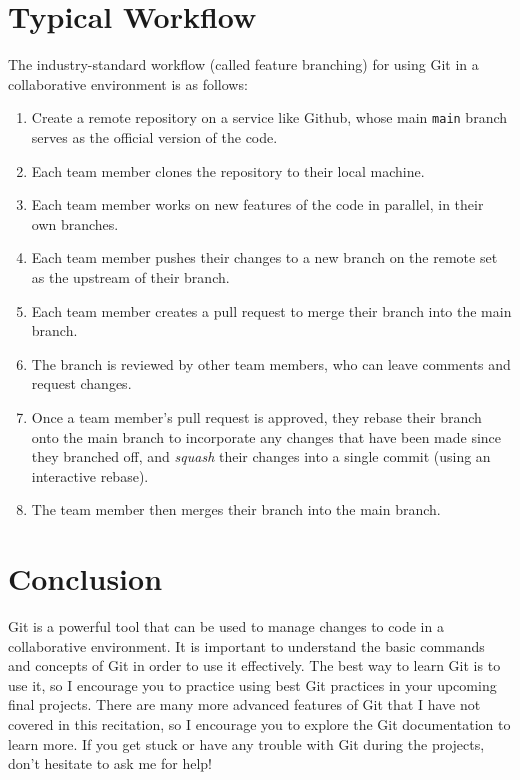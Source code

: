 \documentclass[fleqn]{article}
\begin{document}
\section*{Typical Workflow}

The industry-standard workflow (called feature branching) for using Git in a
collaborative environment is as follows:

\begin{enumerate}

    \item Create a remote repository on a service like Github, whose main
          \texttt{main} branch serves as the official version of the code.
    \item Each team member clones the repository to their local machine.
    \item Each team member works on new features of the code in parallel, in
          their own branches.
    \item Each team member pushes their changes to a new branch on the remote
          set as the upstream of their branch.
    \item Each team member creates a pull request to merge their branch into
          the main branch.
    \item The branch is reviewed by other team members, who can leave comments
          and request changes.
    \item Once a team member's pull request is approved, they rebase their
          branch onto the main branch to incorporate any changes that have been
          made since they branched off, and  \emph{squash} their changes into a
          single commit (using an interactive rebase).
    \item The team member then merges their branch into the main branch.
\end{enumerate}

\section*{Conclusion}

Git is a powerful tool that can be used to manage changes to code in a
collaborative environment. It is important to understand the basic commands
and concepts of Git in order to use it effectively. The best way to learn Git
is to use it, so I encourage you to practice using best Git practices in your
upcoming final projects. There are many more advanced features of Git that I
have not covered in this recitation, so I encourage you to explore the Git
documentation to learn more. If you get stuck or have any trouble with Git
during the projects, don't hesitate to ask me for help!
\end{document}
